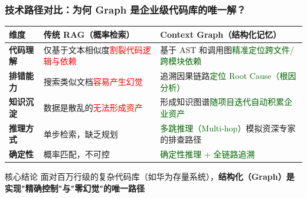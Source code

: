 \documentclass[aspectratio=169,10pt]{beamer}
\begin{document}
\begin{frame}
  \frametitle{技术路径对比：为何 Graph 是企业级代码库的唯一解？}

  \small
  \renewcommand{\arraystretch}{1.5}
  \centering
  \begin{tabular}{|>{\centering}p{2.0cm}|>{\centering}p{4.8cm}|>{\centering\arraybackslash}p{4.8cm}|}
    \hline
    \textbf{维度} & \textbf{传统 RAG（概率检索）} & \textbf{Context Graph（结构化记忆）} \\
    \hline
    \textbf{代码理解} & 仅基于文本相似度\newline \textcolor{red}{割裂代码逻辑与依赖} & 基于 AST 和调用图\newline \textcolor{darkgreen}{精准定位跨文件/跨模块依赖} \\
    \hline
    \textbf{排错能力} & 搜索类似文档\newline \textcolor{red}{容易产生幻觉} & 追溯因果链路\newline \textcolor{darkgreen}{定位 Root Cause（根因分析）} \\
    \hline
    \textbf{知识沉淀} & 数据是散乱的\newline \textcolor{red}{无法形成资产} & 形成知识图谱\newline \textcolor{darkgreen}{随项目迭代自动积累企业资产} \\
    \hline
    \textbf{推理方式} & 单步检索，缺乏规划 & \textcolor{darkgreen}{多跳推理（Multi-hop）}\newline 模拟资深专家的排查路径 \\
    \hline
    \textbf{确定性} & 概率匹配，不可控 & \textcolor{darkgreen}{确定性推理 + 全链路追溯} \\
    \hline
  \end{tabular}

  \vspace{0.3cm}
  \begin{alertblock}{核心结论}
    面对百万行级的复杂代码库（如华为存量系统），\textbf{结构化（Graph）是实现"精确控制"与"零幻觉"的唯一路径}
  \end{alertblock}
\end{frame}
\end{document}
